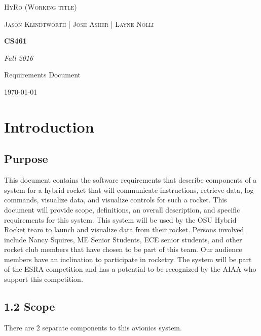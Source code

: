 \documentclass[10pt,draftclsnofoot,onecolumn,compsoc]{IEEEtran}
\begin{document}
\begin{titlepage}
	\centering
	{\scshape\LARGE HyRo (Working title) \par}
	\vspace{1cm}
	{\scshape\Large Jason Klindtworth  |  Josh Asher  |   Layne Nolli\par}
	\vspace{1.5cm}
	{\huge\bfseries CS461\par}
	\vspace{2cm}
	{\Large\itshape Fall 2016\par}
	\vspace{4cm}
	{\large Requirements Document\par}
	\vfill

	{\large \today\par}
\end{titlepage}


\tableofcontents

\section{ Introduction}
\subsection{Purpose}
 This document contains the software requirements that describe components of a system for a hybrid rocket that will communicate instructions, retrieve data, log commands,
 visualize data, and visualize controls for such a rocket.  This document will provide scope, definitions, an overall description, and specific requirements for this system.
 This system will be used by the OSU Hybrid Rocket team to launch and visualize data from their rocket. Persons involved include Nancy Squires, ME Senior Students, ECE senior students,
 and other rocket club members that have chosen to be part of this team. Our audience members have an inclination to participate in rocketry. The system will be part of the ESRA
 competition and has a potential to be recognized by the AIAA who support this competition.
\subsection{1.2 Scope}
 There are 2 separate components to this avionics system. 
\end{document}
